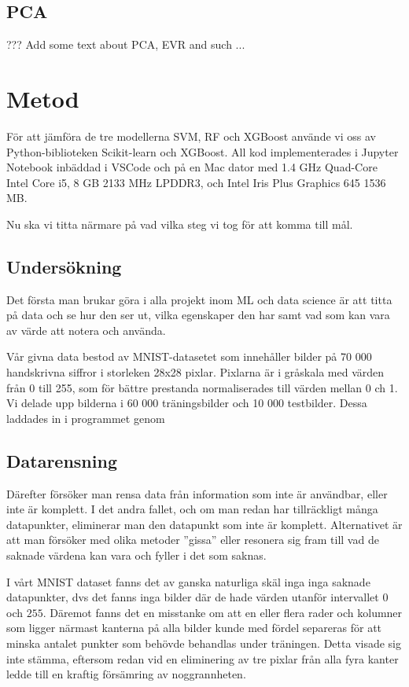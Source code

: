 \documentclass[12pt,a4paper]{article}
\begin{document}
\subsection{PCA}

??? Add some text about PCA, EVR and such ...

\section{Metod}

För att jämföra de tre modellerna SVM, RF och XGBoost använde vi oss av Python-biblioteken Scikit-learn och XGBoost. All kod implementerades i Jupyter Notebook inbäddad i VSCode och på en Mac dator med 1.4 GHz Quad-Core Intel Core i5, 8 GB 2133 MHz LPDDR3, och Intel Iris Plus Graphics 645 1536 MB.

Nu ska vi titta närmare på vad vilka steg vi tog för att komma till mål.

\subsection{Undersökning}

Det första man brukar göra i alla projekt inom ML och data science är att titta på data och se hur den ser ut, vilka egenskaper den har samt vad som kan vara av värde att notera och använda.

Vår givna data bestod av MNIST-datasetet som innehåller bilder på 70 000 handskrivna siffror i storleken 28x28 pixlar. Pixlarna är i gråskala med värden från 0 till 255, som för bättre prestanda normaliserades till värden mellan 0 ch 1. Vi delade upp bilderna i 60 000 träningsbilder och 10 000 testbilder. Dessa laddades in i programmet genom

\subsection{Datarensning}

Därefter försöker man rensa data från information som inte är användbar, eller inte är komplett. I det andra fallet, och om man redan har tillräckligt många datapunkter, eliminerar man den datapunkt som inte är komplett. Alternativet är att man försöker med olika metoder ''gissa'' eller resonera sig fram till vad de saknade värdena kan vara och fyller i det som saknas.

I vårt MNIST dataset fanns det av ganska naturliga skäl inga inga saknade datapunkter, dvs det fanns inga bilder där de hade värden utanför intervallet $0$ och $255$. Däremot fanns det en misstanke om att en eller flera rader och kolumner som ligger närmast kanterna på alla bilder kunde med fördel separeras för att minska antalet punkter som behövde behandlas under träningen. Detta visade sig inte stämma, eftersom redan vid en eliminering av tre pixlar från alla fyra kanter ledde till en kraftig försämring av noggrannheten.
\end{document}
